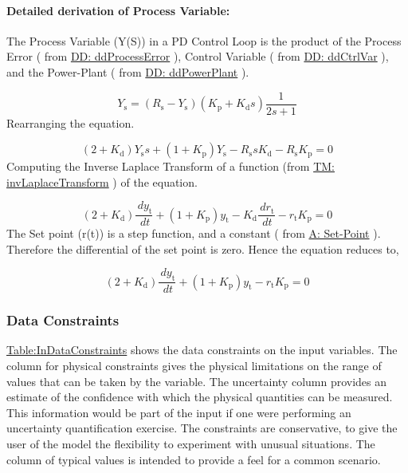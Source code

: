 \documentclass[12pt]{article}
\begin{document}
\paragraph{Detailed derivation of Process Variable:}
\label{IM:pdEquationIMDeriv}
The Process Variable (Y(S)) in a PD Control Loop is the product of the Process Error ( from  \hyperref[DD:ddProcessError]{DD: ddProcessError} ), Control Variable ( from \hyperref[DD:ddCtrlVar]{DD: ddCtrlVar}  ), and the Power-Plant ( from \hyperref[DD:ddPowerPlant]{DD: ddPowerPlant} ).

\begin{displaymath}
{Y_{\text{s}}}=\left({R_{\text{s}}}-{Y_{\text{s}}}\right) \left({K_{\text{p}}}+{K_{\text{d}}} s\right) \frac{1}{2 s+1}
\end{displaymath}
Rearranging the equation.

\begin{displaymath}
\left(2+{K_{\text{d}}}\right) {Y_{\text{s}}} s+\left(1+{K_{\text{p}}}\right) {Y_{\text{s}}}-{R_{\text{s}}} s {K_{\text{d}}}-{R_{\text{s}}} {K_{\text{p}}}=0
\end{displaymath}
Computing the Inverse Laplace Transform of a function (from  \hyperref[TM:invLaplaceTransform]{TM: invLaplaceTransform} ) of the equation.

\begin{displaymath}
\left(2+{K_{\text{d}}}\right) \frac{\,d{y_{\text{t}}}}{\,dt}+\left(1+{K_{\text{p}}}\right) {y_{\text{t}}}-{K_{\text{d}}} \frac{\,d{r_{\text{t}}}}{\,dt}-{r_{\text{t}}} {K_{\text{p}}}=0
\end{displaymath}
The Set point (r(t)) is a step function, and a constant  ( from  \hyperref[setPoint]{A: Set-Point} ). Therefore the  differential of the set point is zero. Hence the equation  reduces to,

\begin{displaymath}
\left(2+{K_{\text{d}}}\right) \frac{\,d{y_{\text{t}}}}{\,dt}+\left(1+{K_{\text{p}}}\right) {y_{\text{t}}}-{r_{\text{t}}} {K_{\text{p}}}=0
\end{displaymath}
\subsubsection{Data Constraints}
\label{Sec:DataConstraints}
\hyperref[Table:InDataConstraints]{Table:InDataConstraints} shows the data constraints on the input variables. The column for physical constraints gives the physical limitations on the range of values that can be taken by the variable. The uncertainty column provides an estimate of the confidence with which the physical quantities can be measured. This information would be part of the input if one were performing an uncertainty quantification exercise. The constraints are conservative, to give the user of the model the flexibility to experiment with unusual situations. The column of typical values is intended to provide a feel for a common scenario.
\end{document}
